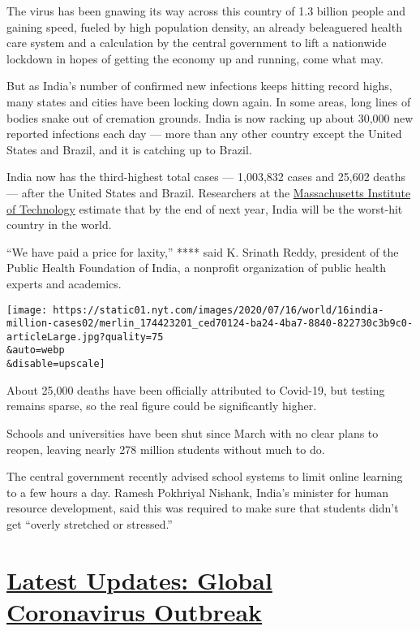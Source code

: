 The virus has been gnawing its way across this country of 1.3 billion
people and gaining speed, fueled by high population density, an already
beleaguered health care system and a calculation by the central
government to lift a nationwide lockdown in hopes of getting the economy
up and running, come what may.

But as India's number of confirmed new infections keeps hitting record
highs, many states and cities have been locking down again. In some
areas, long lines of bodies snake out of cremation grounds. India is now
racking up about 30,000 new reported infections each day --- more than
any other country except the United States and Brazil, and it is
catching up to Brazil.

India now has the third-highest total cases --- 1,003,832 cases and
25,602 deaths --- after the United States and Brazil. Researchers at the
\href{https://papers.ssrn.com/sol3/papers.cfm?abstract_id=3635047}{Massachusetts
Institute of Technology} estimate that by the end of next year, India
will be the worst-hit country in the world.

``We have paid a price for laxity,'' **** said K. Srinath Reddy,
president of the Public Health Foundation of India, a nonprofit
organization of public health experts and academics.

\texttt{[image: https://static01.nyt.com/images/2020/07/16/world/16india-million-cases02/merlin\_174423201\_ced70124-ba24-4ba7-8840-822730c3b9c0-articleLarge.jpg?quality=75\\\&auto=webp\\\&disable=upscale]}

About 25,000 deaths have been officially attributed to Covid-19, but
testing remains sparse, so the real figure could be significantly
higher.

Schools and universities have been shut since March with no clear plans
to reopen, leaving nearly 278 million students without much to do.

The central government recently advised school systems to limit online
learning to a few hours a day. Ramesh Pokhriyal Nishank, India's
minister for human resource development, said this was required to make
sure that students didn't get ``overly stretched or stressed.''

\hypertarget{latest-updates-global-coronavirus-outbreak}{%
\section{\texorpdfstring{\href{https://www.nytimes.com/2020/08/01/world/coronavirus-covid-19.html?action=click\&pgtype=Article\&state=default\&region=MAIN_CONTENT_1\&context=storylines_live_updates}{Latest
Updates: Global Coronavirus
Outbreak}}{Latest Updates: Global Coronavirus Outbreak}}\label{latest-updates-global-coronavirus-outbreak}}


